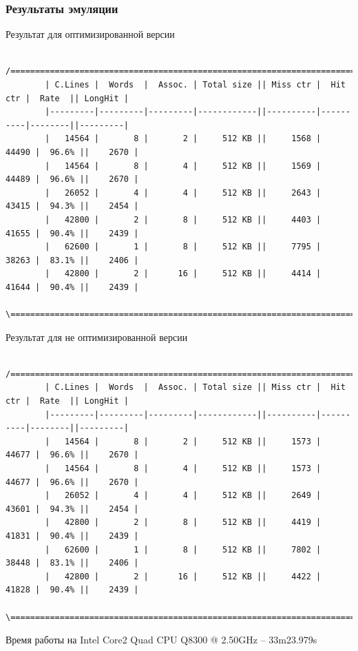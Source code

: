 \documentclass{beamer}
\begin{document}
\begin{frame}[fragile] %
\frametitle{Результаты эмуляции}

\begin{block}{Результат для оптимизированной версии}
\begin{verbatim}
        /=====================================================================================\
        | C.Lines |  Words  |  Assoc. | Total size || Miss ctr |  Hit ctr |  Rate  || LongHit |
        |---------|---------|---------|------------||----------|----------|--------||---------|
        |   14564 |       8 |       2 |     512 KB ||     1568 |    44490 |  96.6% ||    2670 |
        |   14564 |       8 |       4 |     512 KB ||     1569 |    44489 |  96.6% ||    2670 |
        |   26052 |       4 |       4 |     512 KB ||     2643 |    43415 |  94.3% ||    2454 |
        |   42800 |       2 |       8 |     512 KB ||     4403 |    41655 |  90.4% ||    2439 |
        |   62600 |       1 |       8 |     512 KB ||     7795 |    38263 |  83.1% ||    2406 |
        |   42800 |       2 |      16 |     512 KB ||     4414 |    41644 |  90.4% ||    2439 |
        \=====================================================================================/
\end{verbatim}
\end{block}

\begin{block}{Результат для не оптимизированной версии}
\begin{verbatim}
        /=====================================================================================\
        | C.Lines |  Words  |  Assoc. | Total size || Miss ctr |  Hit ctr |  Rate  || LongHit |
        |---------|---------|---------|------------||----------|----------|--------||---------|
        |   14564 |       8 |       2 |     512 KB ||     1573 |    44677 |  96.6% ||    2670 |
        |   14564 |       8 |       4 |     512 KB ||     1573 |    44677 |  96.6% ||    2670 |
        |   26052 |       4 |       4 |     512 KB ||     2649 |    43601 |  94.3% ||    2454 |
        |   42800 |       2 |       8 |     512 KB ||     4419 |    41831 |  90.4% ||    2439 |
        |   62600 |       1 |       8 |     512 KB ||     7802 |    38448 |  83.1% ||    2406 |
        |   42800 |       2 |      16 |     512 KB ||     4422 |    41828 |  90.4% ||    2439 |
        \=====================================================================================/
\end{verbatim}
\end{block}

Время работы на Intel Core2 Quad CPU Q8300 @ 2.50GHz -- 33m23.979s

\end{frame}
\end{document}
